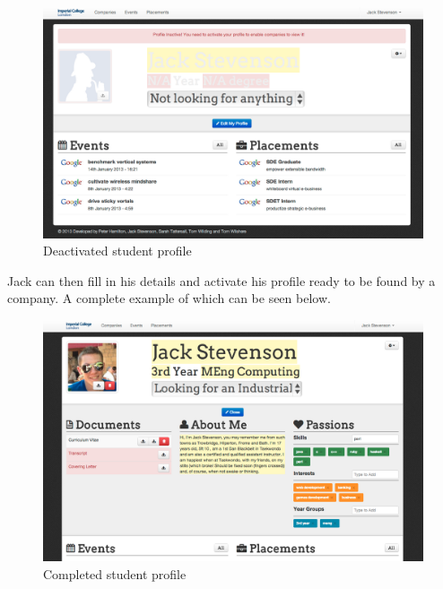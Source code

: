     \begin{figure}[H]\centering
    \includegraphics[scale=0.3]{images/user_experiences/student/sign_up_deactivate}
    \caption{Deactivated student profile}
    \end{figure}

    Jack can then fill in his details and activate his profile ready to be found by a company.
    A complete example of which can be seen below.
    
    \begin{figure}[H]\centering
    \includegraphics[scale=0.3]{images/user_experiences/student/edit_complete}
    \caption{Completed student profile}
    \end{figure}

